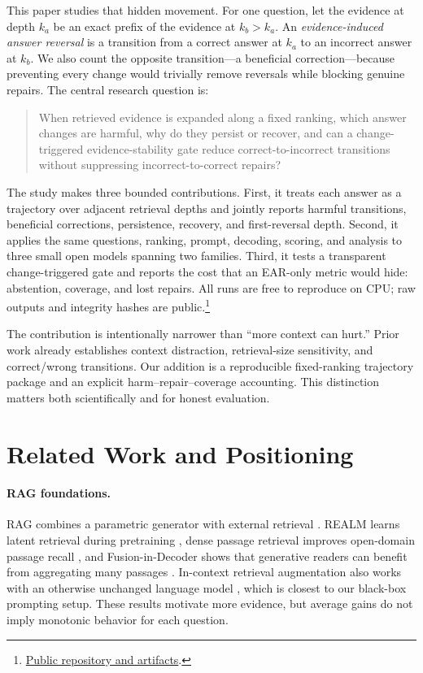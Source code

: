 \documentclass[10pt,twocolumn]{article}
\begin{document}
This paper studies that hidden movement. For one question, let the evidence at depth $k_a$ be an exact prefix of the evidence at $k_b>k_a$. An \emph{evidence-induced answer reversal} is a transition from a correct answer at $k_a$ to an incorrect answer at $k_b$. We also count the opposite transition---a beneficial correction---because preventing every change would trivially remove reversals while blocking genuine repairs. The central research question is:

\begin{quote}
\small
When retrieved evidence is expanded along a fixed ranking, which answer changes are harmful, why do they persist or recover, and can a change-triggered evidence-stability gate reduce correct-to-incorrect transitions without suppressing incorrect-to-correct repairs?
\end{quote}

The study makes three bounded contributions. First, it treats each answer as a trajectory over adjacent retrieval depths and jointly reports harmful transitions, beneficial corrections, persistence, recovery, and first-reversal depth. Second, it applies the same questions, ranking, prompt, decoding, scoring, and analysis to three small open models spanning two families. Third, it tests a transparent change-triggered gate and reports the cost that an EAR-only metric would hide: abstention, coverage, and lost repairs. All runs are free to reproduce on CPU; raw outputs and integrity hashes are public.\footnote{\href{https://github.com/sattipraveena3-sudo/Evidence-Induced-Answer-Reversals}{Public repository and artifacts}.}

The contribution is intentionally narrower than ``more context can hurt.'' Prior work already establishes context distraction, retrieval-size sensitivity, and correct/wrong transitions. Our addition is a reproducible fixed-ranking trajectory package and an explicit harm--repair--coverage accounting. This distinction matters both scientifically and for honest evaluation.

\section{Related Work and Positioning}

\paragraph{RAG foundations.}
RAG combines a parametric generator with external retrieval \citep{lewis2020rag}. REALM learns latent retrieval during pretraining \citep{guu2020realm}, dense passage retrieval improves open-domain passage recall \citep{karpukhin2020dpr}, and Fusion-in-Decoder shows that generative readers can benefit from aggregating many passages \citep{izacard2021fid}. In-context retrieval augmentation also works with an otherwise unchanged language model \citep{ram2023incontext}, which is closest to our black-box prompting setup. These results motivate more evidence, but average gains do not imply monotonic behavior for each question.
\end{document}
